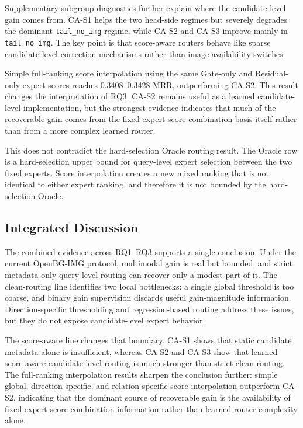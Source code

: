 \documentclass[11pt]{article}
\begin{document}
Supplementary subgroup diagnostics further explain where the candidate-level gain comes from. CA-S1 helps the two head-side regimes but severely degrades the dominant \texttt{tail\_no\_img} regime, while CA-S2 and CA-S3 improve mainly in \texttt{tail\_no\_img}. The key point is that score-aware routers behave like sparse candidate-level correction mechanisms rather than image-availability switches.

Simple full-ranking score interpolation using the same Gate-only and Residual-only expert scores reaches 0.3408--0.3428 MRR, outperforming CA-S2. This result changes the interpretation of RQ3. CA-S2 remains useful as a learned candidate-level implementation, but the strongest evidence indicates that much of the recoverable gain comes from the fixed-expert score-combination basis itself rather than from a more complex learned router.

This does not contradict the hard-selection Oracle routing result. The Oracle row is a hard-selection upper bound for query-level expert selection between the two fixed experts. Score interpolation creates a new mixed ranking that is not identical to either expert ranking, and therefore it is not bounded by the hard-selection Oracle.

\subsection{Integrated Discussion}
The combined evidence across RQ1--RQ3 supports a single conclusion. Under the current OpenBG-IMG protocol, multimodal gain is real but bounded, and strict metadata-only query-level routing can recover only a modest part of it. The clean-routing line identifies two local bottlenecks: a single global threshold is too coarse, and binary gain supervision discards useful gain-magnitude information. Direction-specific thresholding and regression-based routing address these issues, but they do not expose candidate-level expert behavior.

The score-aware line changes that boundary. CA-S1 shows that static candidate metadata alone is insufficient, whereas CA-S2 and CA-S3 show that learned score-aware candidate-level routing is much stronger than strict clean routing. The full-ranking interpolation results sharpen the conclusion further: simple global, direction-specific, and relation-specific score interpolation outperform CA-S2, indicating that the dominant source of recoverable gain is the availability of fixed-expert score-combination information rather than learned-router complexity alone.
\end{document}
